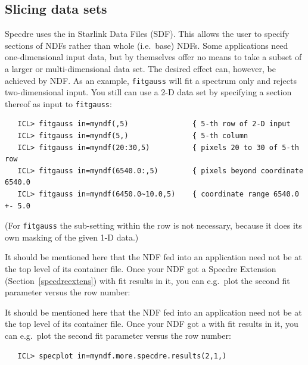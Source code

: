 
\subsection{\label{specdreslice}Slicing data sets}

   Specdre uses the 
   in Starlink Data Files (SDF). This allows the user to specify
   sections of NDFs rather than whole (i.e.\ base) NDFs. Some
   applications need one-dimensional input data, but by themselves offer
   no means to take a subset of a larger or multi-dimensional data
   set. The desired effect can, however, be achieved by NDF. As an
   example, {\tt fitgauss} will fit a spectrum only and rejects
   two-dimensional input. You still can use a 2-D data set by specifying
   a section thereof as input to {\tt fitgauss}:

\begin{verbatim}
   ICL> fitgauss in=myndf(,5)               { 5-th row of 2-D input
   ICL> fitgauss in=myndf(5,)               { 5-th column
   ICL> fitgauss in=myndf(20:30,5)          { pixels 20 to 30 of 5-th row
   ICL> fitgauss in=myndf(6540.0:,5)        { pixels beyond coordinate 6540.0
   ICL> fitgauss in=myndf(6450.0~10.0,5)    { coordinate range 6540.0 +- 5.0
\end{verbatim}

   (For {\tt fitgauss} the sub-setting within the row is not necessary,
   because it does its own masking of the given 1-D data.)

\begin{latexonly}
   It should be mentioned here that the NDF fed into an application need
   not be at the top level of its container file. Once your NDF got a
   Specdre Extension
(Section~\ref{specdreextens})
   with fit results in it, you can e.g.\ plot the second fit parameter
   versus the row number:
\end{latexonly}
\begin{htmlonly}
   It should be mentioned here that the NDF fed into an application need
   not be at the top level of its container file. Once your NDF got a
   with fit results in it, you can e.g.\ plot the second fit parameter
   versus the row number:
\end{htmlonly}

\begin{verbatim}
   ICL> specplot in=myndf.more.specdre.results(2,1,)
\end{verbatim}

